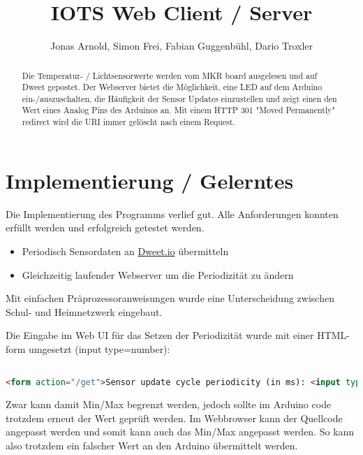 \documentclass{article}
\title{IOTS Web Client / Server}
\author{Jonas Arnold, Simon Frei, Fabian Guggenbühl, Dario Troxler}
\begin{document}
\maketitle

\begin{abstract}
Die Temperatur- / Lichtsensorwerte werden vom MKR board ausgelesen und auf Dweet gepostet. Der Webserver bietet die Möglichkeit, eine LED auf dem Arduino ein-/auszuschalten, die Häufigkeit der Sensor Updates einzustellen und zeigt einen den Wert eines Analog Pins des Arduinos an. Mit einem HTTP 301 "Moved Permanently" redirect wird die URI immer gelöscht nach einem Request.
\end{abstract}

\section{Implementierung / Gelerntes}

Die Implementierung des Programms verlief gut. Alle Anforderungen konnten erfüllt werden und erfolgreich getestet werden.
\begin{itemize}
\item Periodisch Sensordaten an \href{https://dweet.io/follow/IOTS2021}{Dweet.io} übermitteln
\item Gleichzeitig laufender Webserver um die Periodizität zu ändern
\end{itemize}

Mit einfachen Präprozessoranweisungen wurde eine Unterscheidung zwischen Schul- und Heimnetzwerk eingebaut.

Die Eingabe im Web UI für das Setzen der Periodizität wurde mit einer HTML-form umgesetzt (input type=number):
\begin{lstlisting}[frame=single, language=html, breaklines=true]  % Start your code-block

<form action="/get">Sensor update cycle periodicity (in ms): <input type="number" name="periodMs" min="2000" max="60000" value="10000"><input type="submit" value="Set">

\end{lstlisting}
Zwar kann damit Min/Max begrenzt werden, jedoch sollte im Arduino code trotzdem erneut der Wert geprüft werden. Im Webbrowser kann der Quellcode angepasst werden und somit kann auch das Min/Max angepasst werden. So kann also trotzdem ein falscher Wert an den Arduino übermittelt werden.
\end{document}
